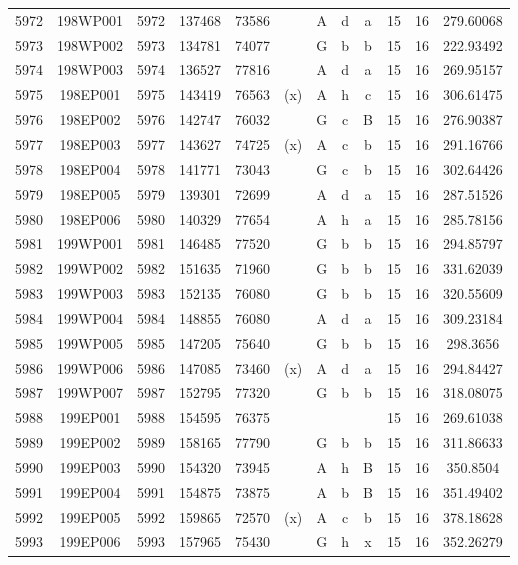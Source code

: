 \begin{tabular}{|*{12}{c|}}
5972 & 198WP001 & 5972 & 137468 & 73586 &  & A & d & a & 15 & 16 & 279.60068 \\ 
5973 & 198WP002 & 5973 & 134781 & 74077 &  & G & b & b & 15 & 16 & 222.93492 \\ 
5974 & 198WP003 & 5974 & 136527 & 77816 &  & A & d & a & 15 & 16 & 269.95157 \\ 
5975 & 198EP001 & 5975 & 143419 & 76563 & (x) & A & h & c & 15 & 16 & 306.61475 \\ 
5976 & 198EP002 & 5976 & 142747 & 76032 &  & G & c & B & 15 & 16 & 276.90387 \\ 
5977 & 198EP003 & 5977 & 143627 & 74725 & (x) & A & c & b & 15 & 16 & 291.16766 \\ 
5978 & 198EP004 & 5978 & 141771 & 73043 &  & G & c & b & 15 & 16 & 302.64426 \\ 
5979 & 198EP005 & 5979 & 139301 & 72699 &  & A & d & a & 15 & 16 & 287.51526 \\ 
5980 & 198EP006 & 5980 & 140329 & 77654 &  & A & h & a & 15 & 16 & 285.78156 \\ 
5981 & 199WP001 & 5981 & 146485 & 77520 &  & G & b & b & 15 & 16 & 294.85797 \\ 
5982 & 199WP002 & 5982 & 151635 & 71960 &  & G & b & b & 15 & 16 & 331.62039 \\ 
5983 & 199WP003 & 5983 & 152135 & 76080 &  & G & b & b & 15 & 16 & 320.55609 \\ 
5984 & 199WP004 & 5984 & 148855 & 76080 &  & A & d & a & 15 & 16 & 309.23184 \\ 
5985 & 199WP005 & 5985 & 147205 & 75640 &  & G & b & b & 15 & 16 & 298.3656 \\ 
5986 & 199WP006 & 5986 & 147085 & 73460 & (x) & A & d & a & 15 & 16 & 294.84427 \\ 
5987 & 199WP007 & 5987 & 152795 & 77320 &  & G & b & b & 15 & 16 & 318.08075 \\ 
5988 & 199EP001 & 5988 & 154595 & 76375 &  &  &  &  & 15 & 16 & 269.61038 \\ 
5989 & 199EP002 & 5989 & 158165 & 77790 &  & G & b & b & 15 & 16 & 311.86633 \\ 
5990 & 199EP003 & 5990 & 154320 & 73945 &  & A & h & B & 15 & 16 & 350.8504 \\ 
5991 & 199EP004 & 5991 & 154875 & 73875 &  & A & b & B & 15 & 16 & 351.49402 \\ 
5992 & 199EP005 & 5992 & 159865 & 72570 & (x) & A & c & b & 15 & 16 & 378.18628 \\ 
5993 & 199EP006 & 5993 & 157965 & 75430 &  & G & h & x & 15 & 16 & 352.26279 \\ 

\end{tabular}
